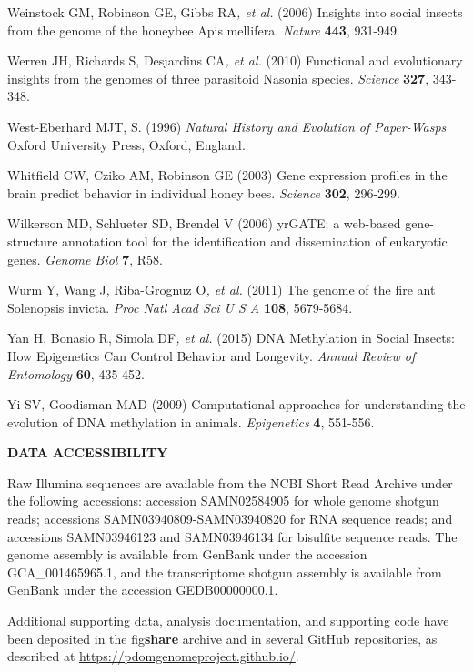 \documentclass[]{article}
\begin{document}
\protect\hypertarget{ux5fENREFux5f69}{}{}Weinstock GM, Robinson GE,
Gibbs RA\emph{, et al.} (2006) Insights into social insects from the
genome of the honeybee Apis mellifera. \emph{Nature} \textbf{443},
931-949.

\protect\hypertarget{ux5fENREFux5f70}{}{}Werren JH, Richards S,
Desjardins CA\emph{, et al.} (2010) Functional and evolutionary insights
from the genomes of three parasitoid Nasonia species. \emph{Science}
\textbf{327}, 343-348.

\protect\hypertarget{ux5fENREFux5f71}{}{}West-Eberhard MJT, S. (1996)
\emph{Natural History and Evolution of Paper-Wasps} Oxford University
Press, Oxford, England.

\protect\hypertarget{ux5fENREFux5f72}{}{}Whitfield CW, Cziko AM,
Robinson GE (2003) Gene expression profiles in the brain predict
behavior in individual honey bees. \emph{Science} \textbf{302}, 296-299.

\protect\hypertarget{ux5fENREFux5f73}{}{}Wilkerson MD, Schlueter SD,
Brendel V (2006) yrGATE: a web-based gene-structure annotation tool for
the identification and dissemination of eukaryotic genes. \emph{Genome
Biol} \textbf{7}, R58.

\protect\hypertarget{ux5fENREFux5f74}{}{}Wurm Y, Wang J, Riba-Grognuz
O\emph{, et al.} (2011) The genome of the fire ant Solenopsis invicta.
\emph{Proc Natl Acad Sci U S A} \textbf{108}, 5679-5684.

\protect\hypertarget{ux5fENREFux5f75}{}{}Yan H, Bonasio R, Simola
DF\emph{, et al.} (2015) DNA Methylation in Social Insects: How
Epigenetics Can Control Behavior and Longevity. \emph{Annual Review of
Entomology} \textbf{60}, 435-452.

\protect\hypertarget{ux5fENREFux5f76}{}{}Yi SV, Goodisman MAD (2009)
Computational approaches for understanding the evolution of DNA
methylation in animals. \emph{Epigenetics} \textbf{4}, 551-556.

\textbf{DATA ACCESSIBILITY}

Raw Illumina sequences are available from the NCBI Short Read Archive
under the following accessions: accession SAMN02584905 for whole genome
shotgun reads; accessions SAMN03940809-SAMN03940820 for RNA sequence
reads; and accessions SAMN03946123 and SAMN03946134 for bisulfite
sequence reads. The genome assembly is available from GenBank under the
accession GCA\_001465965.1, and the transcriptome shotgun assembly is
available from GenBank under the accession GEDB00000000.1.

Additional supporting data, analysis documentation, and supporting code
have been deposited in the fig\textbf{share} archive and in several
GitHub repositories, as described at
\url{https://pdomgenomeproject.github.io/}.
\end{document}
